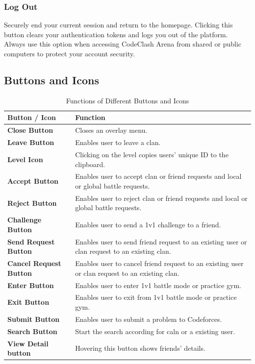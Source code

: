 \documentclass[12pt]{article}
\begin{document}
\subsubsection{Log Out}
Securely end your current session and return to the homepage. Clicking this button clears your authentication tokens and logs you out of the platform. Always use this option when accessing CodeClash Arena from shared or public computers to protect
your account security.
\newpage
\subsection{Buttons and Icons}
\begin{table}[h]
\centering
\begin{tabularx}{\textwidth}{p{5cm} X}
\toprule
\textbf{Button / Icon} & \textbf{Function} \\
\midrule
\textbf{Close Button} & Closes an overlay menu. \\

\textbf{Leave Button} & Enables user to leave a clan. \\

\textbf{Level Icon} & Clicking on the level copies users' unique ID to the clipboard. \\

\textbf{Accept Button} & Enables user to accept clan or friend requests and local or global battle requests. \\

\textbf{Reject Button} & Enables user to reject clan or friend requests and local or global battle requests. \\

\textbf{Challenge Button} & Enables user to send a 1v1 challenge to a friend. \\

\textbf{Send Request Button} & Enables user to send friend request to an existing user or clan request to an existing clan. \\

\textbf{Cancel Request Button} & Enables user to cancel friend request to an existing user or clan request to an existing clan. \\

\textbf{Enter Button} & Enables user to enter 1v1 battle mode or practice gym. \\

\textbf{Exit Button} & Enables user to exit from 1v1 battle mode or practice gym. \\

\textbf{Submit Button} & Enables user to submit a problem to Codeforces. \\

\textbf{Search Button } & Start the search according  for caln or a existing user.\\

\textbf{View Detail button } & Hovering this button shows friends' details.\\
\bottomrule
\end{tabularx}
\caption{Functions of Different Buttons and Icons}
\end{table}
\newpage
\end{document}
